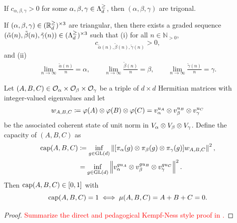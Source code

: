 \documentclass[notitlepage, 10pt]{article}
\begin{document}
\begin{thm}
    If $c_{\alpha,\beta,\gamma} > 0$ for some $\alpha, \beta, \gamma \in \Lambda^{\geq}_{d}$, then $(\alpha,\beta,\gamma)$ are trigonal.
\end{thm}

\begin{thm}
    If $(\alpha,\beta,\gamma) \in (\mathbb R^{\geq}_{d})^{\times 3}$ are triangular, then there exists a graded sequence
    $(\tilde \alpha(n), \tilde \beta(n), \tilde \gamma(n)) \in (\Lambda^{\geq}_{d})^{\times 3}$ such that (i) for all $n \in \mathbb N_{>0}$,
    \begin{equation}
        c_{\tilde \alpha(n), \tilde \beta(n), \tilde \gamma(n)} > 0,
    \end{equation}
    and (ii)
    \begin{align}
        \lim_{n\to\infty} \frac{\tilde \alpha(n)}{n} = \alpha, \qquad
        \lim_{n\to\infty} \frac{\tilde \beta(n)}{n} = \beta, \qquad
        \lim_{n\to\infty} \frac{\tilde \gamma(n)}{n} = \gamma.
    \end{align}
\end{thm}

\begin{prop}
    \label{prop:kempf-ness-abc}
    Let $(A,B,C) \in \mathcal O_{\alpha} \times \mathcal O_{\beta} \times \mathcal O_{\gamma}$ be a triple of $d\times d$ Hermitian matrices with integer-valued eigenvalues and let
    \begin{equation}
        w_{A,B,C} \coloneqq \varphi(A) \otimes \varphi(B) \otimes \varphi(C) = v_\alpha^{u_A} \otimes v_\beta^{u_B} \otimes v_\gamma^{u_C}
    \end{equation}
    be the associated coherent state of unit norm in $V_{\alpha} \otimes V_{\beta} \otimes V_{\gamma}$.
    Define the capacity of $(A,B,C)$ as
    \begin{align}
        \operatorname{cap}(A,B,C) 
        &\coloneqq \inf_{g \in \operatorname{GL}(d)} \left\lVert[\pi_{\alpha}(g)\otimes\pi_{\beta}(g)\otimes\pi_{\gamma}(g)] w_{A,B,C}\right\rVert^{2}, \\
        &= \inf_{g \in \operatorname{GL}(d)} \left\lVert v_\alpha^{gu_A} \otimes v_\beta^{gu_B} \otimes v_\gamma^{gu_C}\right\rVert^{2}.
    \end{align}
    Then $\operatorname{cap}(A,B,C) \in [0,1]$ with 
    \begin{equation}
        \operatorname{cap}(A,B,C) = 1 \iff \mu(A,B,C) = A+B+C = 0.
    \end{equation}
\end{prop}
\begin{proof}
    \textcolor{red}{Summarize the direct and pedagogical Kempf-Ness style proof in \cite[Proposition 2.3]{berline2018horn}.} 
\end{proof}
\end{document}
